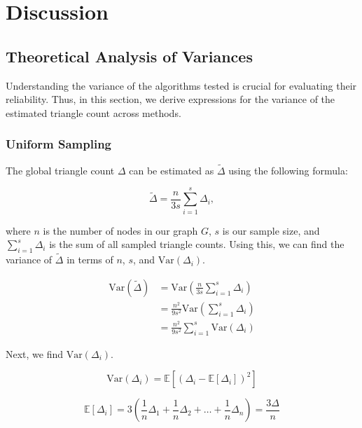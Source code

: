 \documentclass[11pt]{article}
\begin{document}
\newpage

\section{Discussion}

\subsection{Theoretical Analysis of Variances}

Understanding the variance of the algorithms tested is crucial for evaluating their reliability.
Thus, in this section, we derive expressions for the variance of the estimated triangle count across methods.

\subsubsection{Uniform Sampling}

The global triangle count $\Delta$ can be estimated as $\tilde{\Delta}$ using the following formula:

\[
\tilde{\Delta} = \frac{n}{3s} \sum_{i = 1}^{s} \Delta_i,
\]

where $n$ is the number of nodes in our graph $G$, $s$ is our sample size, and $\sum_{i = 1}^{s} \Delta_i$ is the sum of all sampled triangle counts. 
Using this, we can find the variance of $\tilde{\Delta}$ in terms of $n$, $s$, and $\mathrm{Var}(\Delta_i)$.

\[
\begin{aligned}
\mathrm{Var}(\tilde{\Delta}) &= \mathrm{Var} \left( \frac{n}{3s} \sum_{i=1}^{s} \Delta_i \right) \\
&= \frac{n^2}{9s^2} \mathrm{Var} \left( \sum_{i=1}^{s} \Delta_i \right) \\
&= \frac{n^2}{9s^2} \sum_{i=1}^{s} \mathrm{Var}(\Delta_i)
\end{aligned}
\]

Next, we find $\mathrm{Var}(\Delta_i)$.

\[
\mathrm{Var}(\Delta_i) = \mathbb{E}[(\Delta_i - \mathbb{E}[\Delta_i])^2]
\]

\[
\mathbb{E}[\Delta_i] = 3(\frac{1}{n} \Delta_1 + \frac{1}{n} \Delta_2 + \ldots + \frac{1}{n} \Delta_n) = \frac{3\Delta}{n}
\]
\end{document}
